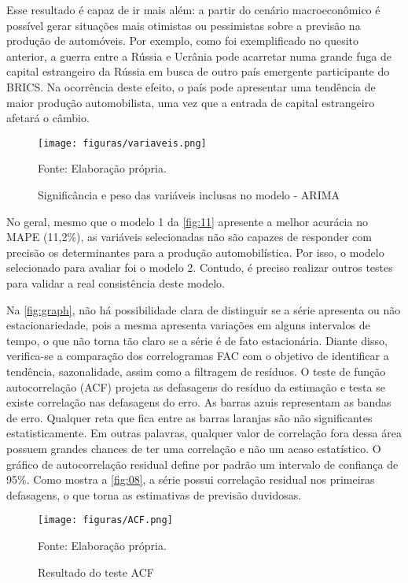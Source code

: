 \documentclass[
article, %
12pt, %
oneside, %
a4paper, %
portuguese, %
portuguese %
]{abntex2}
\begin{document}
Esse resultado é capaz de ir mais além: a partir do cenário macroeconômico é possível gerar situações mais otimistas ou pessimistas sobre a previsão na produção de automóveis. Por exemplo, como foi exemplificado no quesito anterior, a guerra entre a Rússia e Ucrânia pode acarretar numa grande fuga de capital estrangeiro da Rússia em busca de outro país emergente participante do BRICS. Na ocorrência deste efeito, o país pode apresentar uma tendência de maior produção automobilista, uma vez que a entrada de capital estrangeiro afetará o câmbio.

\begin{figure}[H]
    \centering
    \caption{Significância e peso das variáveis inclusas no modelo - ARIMA}
    \texttt{[image: figuras/variaveis.png]}
    \begin{flushleft}
    Fonte: Elaboração própria.
    \end{flushleft}
    \label{fig:11}
\end{figure}

No geral, mesmo que o modelo 1 da \autoref{fig:11} apresente a melhor acurácia no MAPE (11,2\%), as variáveis selecionadas não são capazes de responder com precisão os determinantes para a produção automobilística. Por isso, o modelo selecionado para avaliar foi o modelo 2. Contudo, é preciso realizar outros testes para validar a real consistência deste modelo.

Na \autoref{fig:graph}, não há possibilidade clara de distinguir se a série apresenta ou não estacionariedade, pois a mesma apresenta variações em alguns intervalos de tempo, o que não torna tão claro se a série é de fato estacionária. Diante disso, verifica-se a comparação dos correlogramas FAC com o objetivo de identificar a tendência, sazonalidade, assim como a filtragem de resíduos. O teste de função autocorrelação (ACF) projeta as defasagens do resíduo da estimação e testa se existe correlação nas defasagens do erro. As barras azuis representam as bandas de erro. Qualquer reta que fica entre as barras laranjas são não significantes estatisticamente. Em outras palavras, qualquer valor de correlação fora dessa área possuem grandes chances de ter uma correlação e não um acaso estatístico. O gráfico de autocorrelação residual define por padrão um intervalo de confiança de 95\%. Como mostra a \autoref{fig:08}, a série possui correlação residual nos primeiras defasagens, o que torna as estimativas de previsão duvidosas.

\begin{figure}[H]
    \centering
    \caption{Resultado do teste ACF}
    \texttt{[image: figuras/ACF.png]}
    \begin{flushleft}
    Fonte: Elaboração própria.
    \end{flushleft}

    \label{fig:08}
\end{figure}
\end{document}
